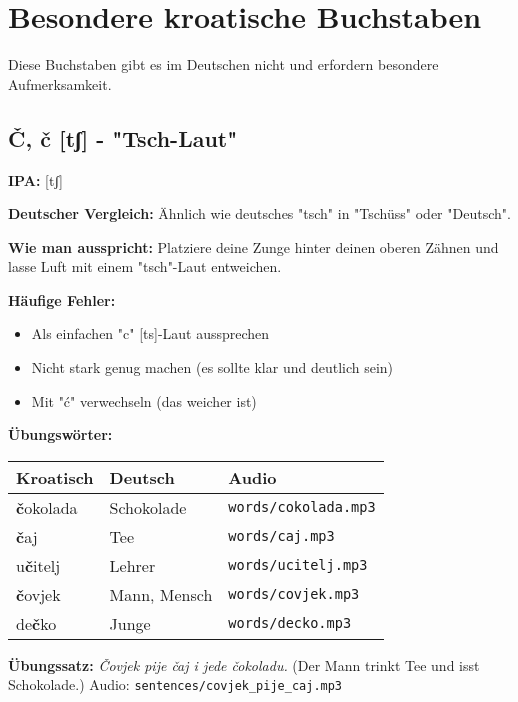 \section{Besondere kroatische Buchstaben}

Diese Buchstaben gibt es im Deutschen nicht und erfordern besondere Aufmerksamkeit.

\subsection{Č, č [tʃ] - "Tsch-Laut"}

\begin{tcolorbox}[colback=lightblue!30, colframe=croatianblue, title=\textbf{Č, č}]

\textbf{IPA:} [tʃ]

\textbf{Deutscher Vergleich:}
Ähnlich wie deutsches "tsch" in "Tschüss" oder "Deutsch".

\textbf{Wie man ausspricht:}
Platziere deine Zunge hinter deinen oberen Zähnen und lasse Luft mit einem "tsch"-Laut entweichen.

\textbf{Häufige Fehler:}
\begin{itemize}
    \item Als einfachen "c" [ts]-Laut aussprechen
    \item Nicht stark genug machen (es sollte klar und deutlich sein)
    \item Mit "ć" verwechseln (das weicher ist)
\end{itemize}

\textbf{Übungswörter:}
\begin{tabular}{lll}
\textbf{Kroatisch} & \textbf{Deutsch} & \textbf{Audio} \\
\midrule
\textbf{č}okolada & Schokolade & \texttt{words/cokolada.mp3} \\
\textbf{č}aj & Tee & \texttt{words/caj.mp3} \\
u\textbf{č}itelj & Lehrer & \texttt{words/ucitelj.mp3} \\
\textbf{č}ovjek & Mann, Mensch & \texttt{words/covjek.mp3} \\
de\textbf{č}ko & Junge & \texttt{words/decko.mp3} \\
\end{tabular}

\textbf{Übungssatz:}
\textit{Čovjek pije čaj i jede čokoladu.}
(Der Mann trinkt Tee und isst Schokolade.)
Audio: \texttt{sentences/covjek\_pije\_caj.mp3}

\end{tcolorbox}

